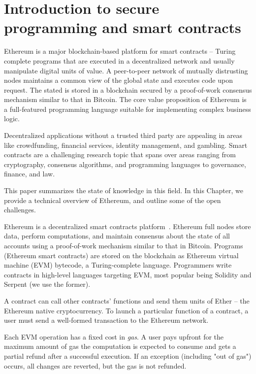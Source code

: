 \chapter{Introduction to secure programming and smart contracts}

\label{Chapter09Introcontracts}

Ethereum is a major blockchain-based platform for smart contracts -- Turing complete programs that are executed in a decentralized network and usually manipulate digital units of value.
A peer-to-peer network of mutually distrusting nodes maintains a common view of the global state and executes code upon request.
The stated is stored in a blockchain secured by a proof-of-work consensus mechanism similar to that in Bitcoin.
The core value proposition of Ethereum is a full-featured programming language suitable for implementing complex business logic.

Decentralized applications without a trusted third party are appealing in areas like crowdfunding, financial services, identity management, and gambling.
Smart contracts are a challenging research topic that spans over areas ranging from cryptography, consensus algorithms, and programming languages to governance, finance, and law.

This paper summarizes the state of knowledge in this field.
In this Chapter, we provide a technical overview of Ethereum, and outline some of the open challenges.

Ethereum is a decentralized smart contracts platform~\cite{Buterin2014, Wood2014}.
Ethereum full nodes store data, perform computations, and maintain consensus about the state of all accounts using a proof-of-work mechanism similar to that in Bitcoin.
Programs (Ethereum smart contracts) are stored on the blockchain as Ethereum virtual machine (EVM) bytecode, a Turing-complete language.
Programmers write contracts in high-level languages targeting EVM, most popular being Solidity and Serpent (we use the former).

A contract can call other contracts' functions and send them units of Ether -- the Ethereum native cryptocurrency.
To launch a particular function of a contract, a user must send a well-formed transaction to the Ethereum network.

Each EVM operation has a fixed cost in \textit{gas}.
A user pays upfront for the maximum amount of gas the computation is expected to consume and gets a partial refund after a successful execution.
If an exception (including "out of gas") occurs, all changes are reverted, but the gas is not refunded.



